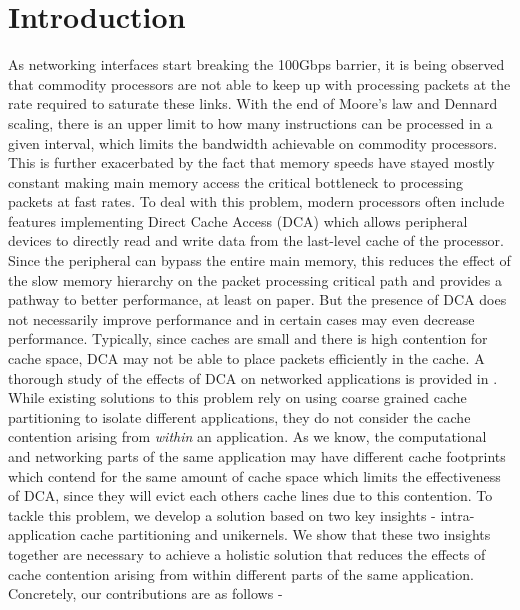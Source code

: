 \documentclass[sigconf,authorversion,noacm]{acmart}
\begin{document}
\maketitle

\section{Introduction}

As networking interfaces start breaking the 100Gbps barrier, it is being
observed that commodity processors are not able to keep up with processing
packets at the rate required to saturate these links. With the end of Moore's
law and Dennard scaling, there is an upper limit to how many instructions can be
processed in a given interval, which limits the bandwidth achievable on
commodity processors. This is further exacerbated by the fact that memory speeds
have stayed mostly constant making main memory access the critical bottleneck
to processing packets at fast rates. To deal with this problem, modern
processors often include features implementing Direct Cache Access (DCA) which
allows peripheral devices to directly read and write data from the last-level
cache of the processor. Since the peripheral can bypass the entire main memory,
this reduces the effect of the slow memory hierarchy on the packet processing
critical path and provides a pathway to better performance, at least on paper.
But the presence of DCA does not necessarily improve performance and in certain
cases may even decrease performance. Typically, since caches are small and there
is high contention for cache space, DCA may not be able to place packets
efficiently in the cache. A thorough study of the effects of DCA on networked
applications is provided in \cite{alireza_2020}. While existing solutions to
this problem rely on using coarse grained cache partitioning to isolate
different applications, they do not consider the cache contention arising from
\textit{within} an application. As we know, the computational and networking
parts of the same application may have different cache footprints which contend
for the same amount of cache space which limits the effectiveness of DCA, since
they will evict each others cache lines due to this contention. To tackle this
problem, we develop a solution based on two key insights - intra-application
cache partitioning and unikernels. We show that these two insights together are
necessary to achieve a holistic solution that reduces the effects of cache
contention arising from within different parts of the same application.
Concretely, our contributions are as follows - 
\end{document}
